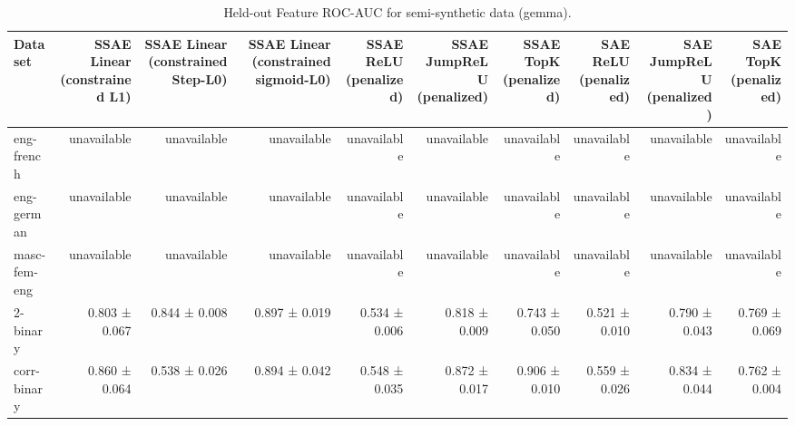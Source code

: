 \begin{table}[t]
\centering
\caption{Held-out Feature ROC-AUC for semi-synthetic data (gemma).}
\label{tab:semisynthetic-gemma-sae-auc}
\begin{tabular}{lrrrrrrrrr}
\toprule
Dataset & SSAE Linear (constrained L1) & SSAE Linear (constrained Step-L0) & SSAE Linear (constrained sigmoid-L0) & SSAE ReLU (penalized) & SSAE JumpReLU (penalized) & SSAE TopK (penalized) & SAE ReLU (penalized) & SAE JumpReLU (penalized) & SAE TopK (penalized) \\
\midrule
eng-french & unavailable & unavailable & unavailable & unavailable & unavailable & unavailable & unavailable & unavailable & unavailable \\
eng-german & unavailable & unavailable & unavailable & unavailable & unavailable & unavailable & unavailable & unavailable & unavailable \\
masc-fem-eng & unavailable & unavailable & unavailable & unavailable & unavailable & unavailable & unavailable & unavailable & unavailable \\
2-binary & 0.803 ± 0.067 & 0.844 ± 0.008 & 0.897 ± 0.019 & 0.534 ± 0.006 & 0.818 ± 0.009 & 0.743 ± 0.050 & 0.521 ± 0.010 & 0.790 ± 0.043 & 0.769 ± 0.069 \\
corr-binary & 0.860 ± 0.064 & 0.538 ± 0.026 & 0.894 ± 0.042 & 0.548 ± 0.035 & 0.872 ± 0.017 & 0.906 ± 0.010 & 0.559 ± 0.026 & 0.834 ± 0.044 & 0.762 ± 0.004 \\
\bottomrule
\end{tabular}
\end{table}
